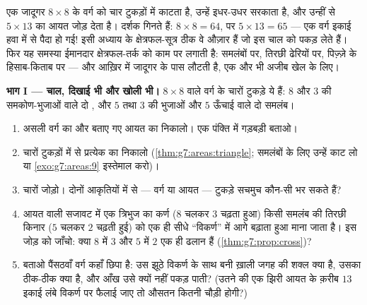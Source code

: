 \begin{problem}[{सप्ताहांत समस्या --- वह मशहूर ``प्रमाण'' कि
$64 = 65$, जिसका भेद क्षेत्रफल और ढलान खोल देते हैं, और मिठाई में
पिज़्ज़े तथा छल्ले}]
\label{pb:g7:areas:1}
एक जादूगर $8 \times 8$ के वर्ग को चार टुकड़ों में काटता है, उन्हें
इधर-उधर सरकाता है, और उन्हीं से $5 \times 13$ का आयत जोड़ देता है।
दर्शक गिनते हैं: $8 \times 8 = 64$, पर $5 \times 13 = 65$ --- एक
वर्ग इकाई हवा में से पैदा हो गई! इसी अध्याय के क्षेत्रफल-सूत्र ठीक
वे औज़ार हैं जो इस चाल को पकड़ लेते हैं। फिर यह समस्या ईमानदार
क्षेत्रफल-तर्क को काम पर लगाती है: समलंबों पर, तिरछी ढेरियों पर,
पिज़्ज़े के हिसाब-किताब पर --- और आख़िर में जादूगर के पास लौटती है,
एक और भी अजीब खेल के लिए।

\medskip
\noindent\textbf{भाग I --- चाल, दिखाई भी और खोली भी।}
$8 \times 8$ वाले वर्ग के चारों टुकड़े ये हैं: $8$ और $3$ की
समकोण-भुजाओं वाले दो , और $5$ तथा $3$ की 
भुजाओं और $5$ ऊँचाई वाले दो  समलंब।
\begin{enumerate}
  \item असली वर्ग का  और बताए गए आयत का 
        निकालो। एक पंक्ति में गड़बड़ी बताओ।
  \item चारों टुकड़ों में से प्रत्येक का  निकालो
        (\cref{thm:g7:areas:triangle}; समलंबों के लिए उन्हें काट
        लो या \cref{exo:g7:areas:9} इस्तेमाल करो)।
  \item चारों  जोड़ो। दोनों आकृतियों में से --- वर्ग या
        आयत --- टुकड़े सचमुच कौन-सी भर सकते हैं?
  \item आयत वाली सजावट में एक त्रिभुज का कर्ण ($8$ चलकर $3$
        चढ़ता हुआ) किसी समलंब की तिरछी किनार ($5$ चलकर $2$ चढ़ती
        हुई) को एक ही सीधे ``विकर्ण'' में आगे बढ़ाता हुआ माना
        जाता है। इस जोड़ को जाँचो: क्या $8$ में $3$ और $5$ में
        $2$ एक ही ढलान हैं (\cref{thm:g7:prop:cross})?
  \item बताओ पैंसठवाँ वर्ग कहाँ छिपा है: उस झूठे विकर्ण के साथ
        बनी ख़ाली जगह की शक्ल क्या है, उसका ठीक-ठीक 
        क्या है, और आँख उसे क्यों नहीं पकड़ पाती? (उतने 
        की एक झिरी आयत के क़रीब $13$ इकाई लंबे विकर्ण पर फैलाई
        जाए तो औसतन कितनी चौड़ी होगी?)
\end{enumerate}


\end{problem}
